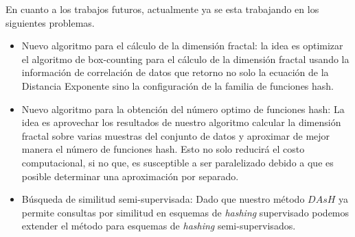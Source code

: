 En cuanto a los trabajos futuros, actualmente ya se esta trabajando en los siguientes problemas. 

\begin{itemize}
\item Nuevo algoritmo para el cálculo de la dimensión fractal: la idea es optimizar el algoritmo de box-counting para el cálculo de la dimensión fractal usando  la información de correlación de datos que retorno no solo la ecuación de la Distancia Exponente sino la configuración de la familia de funciones hash. 

\item Nuevo algoritmo para la obtención del número optimo de funciones hash: La idea es aprovechar los resultados de nuestro algoritmo calcular la dimensión fractal sobre varias muestras del conjunto de datos y aproximar de mejor manera el número de funciones hash.  Esto no solo reducirá el costo computacional, si no que, es susceptible a ser paralelizado debido a que es posible determinar una aproximación por separado.
 
\item Búsqueda de similitud semi-supervisada: Dado que nuestro método $DAsH$ ya permite consultas por similitud en esquemas de \textit{hashing} supervisado podemos extender el método para esquemas de \textit{hashing} semi-supervisados.

\end{itemize}
